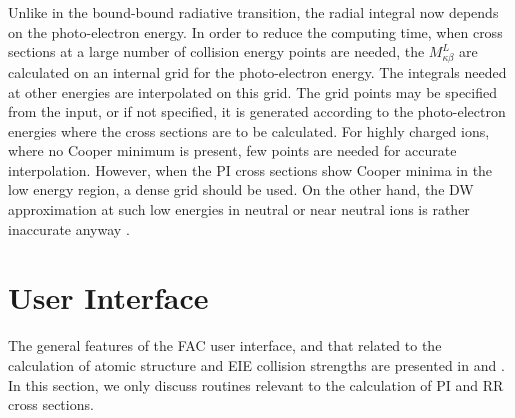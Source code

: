 \documentclass{elsart}
\begin{document}
Unlike in the bound-bound radiative transition, the radial integral now
depends on the photo-electron energy. In order to reduce the computing time,
when cross sections at a large number of collision energy points are needed,
the $M^L_{\kappa\beta}$ are calculated on an internal grid for the
photo-electron 
energy. The integrals needed at other energies are interpolated on this
grid. The grid points may be specified from the input, or if not specified, it
is generated according to the photo-electron energies where the cross sections
are to be calculated. For highly charged ions, where no Cooper minimum is
present, few points are needed for accurate interpolation. However, when the
PI cross sections show Cooper minima in the low energy region, a dense grid
should be used. On the other hand, the DW approximation at such low energies
in neutral or near neutral ions is rather inaccurate anyway \citep{zhang98}.

\section{User Interface}
\label{sec_program}
The general features of the FAC user interface, and that related to
the calculation of 
atomic structure and EIE collision strengths are presented in
and . In this section, we only discuss routines relevant to
the calculation of PI and RR cross sections. 
\end{document}
